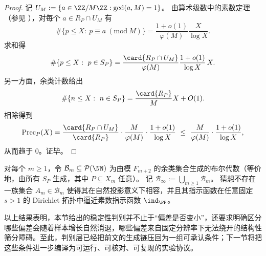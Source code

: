 \begin{proof}
记 \(U_M:=\{a\in\ZZ/M\ZZ:\gcd(a,M)=1\}\)。
由算术级数中的素数定理（参见 \cite{Titchmarsh1986RiemannZeta}），对每个 \(a\in R_P\cap U_M\) 有
\[
\#\{p\le X:\ p\equiv a\ (\mathrm{mod}\ M)\}
=\frac{1+o(1)}{\varphi(M)}\frac{X}{\log X}.
\]
求和得
\[
\#\{p\le X:\ p\in S_P\}
=\frac{\card{R_P\cap U_M}}{\varphi(M)}\frac{1+o(1)}{\log X}\,X.
\]
另一方面，余类计数给出
\[
\#\{n\le X:\ n\in S_P\}=\frac{\card{R_P}}{M}X+O(1).
\]
相除得到
\[
\mathrm{Prec}_P(X)
=\frac{\card{R_P\cap U_M}}{\card{R_P}}\cdot\frac{M}{\varphi(M)}\cdot\frac{1+o(1)}{\log X}
\ \le\ \frac{M}{\varphi(M)}\cdot\frac{1+o(1)}{\log X},
\]
从而趋于 \(0\)。证毕。
\end{proof}

\begin{conjecture}\label{conj:prime-lift-obstruction-finite-resolution}
对每个 \(m\ge 1\)，令 \(\mathcal B_m\subseteq\mathcal P(\NN)\) 为由模 \(F_{m+2}\) 的余类集合生成的布尔代数（等价地，由所有 \(S_P\) 生成，其中 \(P\subseteq X_m\) 任意）。
记 \(\mathcal B_\infty:=\bigcup_{m\ge 1}\mathcal B_m\)。
猜想不存在一族集合 \(A_m\in\mathcal B_m\) 使得其在自然投影意义下相容，并且其指示函数在任意固定 \(s>1\) 的 Dirichlet 拓扑中逼近素数指示函数 \(\ind_{\PP}\)。
\end{conjecture}

以上结果表明，本节给出的稳定性判别并不止于“偏差是否变小”，还要求明确区分哪些偏差会随着样本增长自然消退，哪些偏差来自固定分辨率下无法绕开的结构性筛分障碍。至此，判别层已经把前文的生成链压回为一组可承认条件；下一节将把这些条件进一步编译为可运行、可核对、可复现的实验协议。
